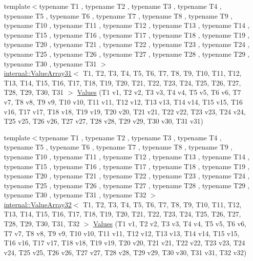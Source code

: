 \begin{DoxyCompactItemize}
\item 
{\footnotesize template$<$typename T1 , typename T2 , typename T3 , typename T4 , typename T5 , typename T6 , typename T7 , typename T8 , typename T9 , typename T10 , typename T11 , typename T12 , typename T13 , typename T14 , typename T15 , typename T16 , typename T17 , typename T18 , typename T19 , typename T20 , typename T21 , typename T22 , typename T23 , typename T24 , typename T25 , typename T26 , typename T27 , typename T28 , typename T29 , typename T30 , typename T31 $>$ }\\\mbox{\hyperlink{classtesting_1_1internal_1_1ValueArray31}{internal\+::\+Value\+Array31}}$<$ T1, T2, T3, T4, T5, T6, T7, T8, T9, T10, T11, T12, T13, T14, T15, T16, T17, T18, T19, T20, T21, T22, T23, T24, T25, T26, T27, T28, T29, T30, T31 $>$ \mbox{\hyperlink{namespacetesting_a40d9696e1754455c8329a866c17ed7bb}{Values}} (T1 v1, T2 v2, T3 v3, T4 v4, T5 v5, T6 v6, T7 v7, T8 v8, T9 v9, T10 v10, T11 v11, T12 v12, T13 v13, T14 v14, T15 v15, T16 v16, T17 v17, T18 v18, T19 v19, T20 v20, T21 v21, T22 v22, T23 v23, T24 v24, T25 v25, T26 v26, T27 v27, T28 v28, T29 v29, T30 v30, T31 v31)
\item 
{\footnotesize template$<$typename T1 , typename T2 , typename T3 , typename T4 , typename T5 , typename T6 , typename T7 , typename T8 , typename T9 , typename T10 , typename T11 , typename T12 , typename T13 , typename T14 , typename T15 , typename T16 , typename T17 , typename T18 , typename T19 , typename T20 , typename T21 , typename T22 , typename T23 , typename T24 , typename T25 , typename T26 , typename T27 , typename T28 , typename T29 , typename T30 , typename T31 , typename T32 $>$ }\\\mbox{\hyperlink{classtesting_1_1internal_1_1ValueArray32}{internal\+::\+Value\+Array32}}$<$ T1, T2, T3, T4, T5, T6, T7, T8, T9, T10, T11, T12, T13, T14, T15, T16, T17, T18, T19, T20, T21, T22, T23, T24, T25, T26, T27, T28, T29, T30, T31, T32 $>$ \mbox{\hyperlink{namespacetesting_afeff614d4c808c753bbfa208409ad664}{Values}} (T1 v1, T2 v2, T3 v3, T4 v4, T5 v5, T6 v6, T7 v7, T8 v8, T9 v9, T10 v10, T11 v11, T12 v12, T13 v13, T14 v14, T15 v15, T16 v16, T17 v17, T18 v18, T19 v19, T20 v20, T21 v21, T22 v22, T23 v23, T24 v24, T25 v25, T26 v26, T27 v27, T28 v28, T29 v29, T30 v30, T31 v31, T32 v32)
\item 

\end{DoxyCompactItemize}
